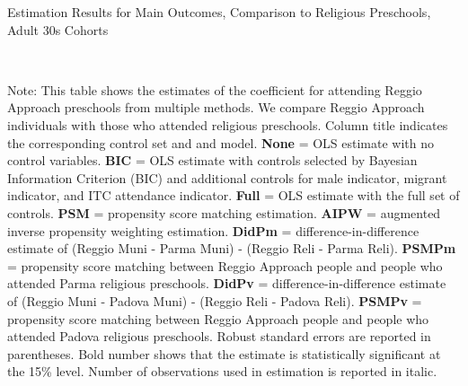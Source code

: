 \begin{table}[H] \caption{Estimation Results for Main Outcomes, Comparison to Religious Preschools, Adult 30s Cohorts} \label{ols-M-adult30-reg-reli}
\scalebox{0.75}{}
\vspace{1ex} \\
\footnotesize\raggedright{Note: This table shows the estimates of the coefficient for attending Reggio Approach preschools from multiple methods. We compare Reggio Approach individuals with those who attended religious preschools. Column title indicates the corresponding control set and and model. \textbf{None} = OLS estimate with no control variables. \textbf{BIC} = OLS estimate with controls selected by Bayesian Information Criterion (BIC) and additional controls for male indicator, migrant indicator, and ITC attendance indicator. \textbf{Full} = OLS estimate with the full set of controls. \textbf{PSM} =  propensity score matching estimation. \textbf{AIPW} = augmented inverse propensity weighting estimation. \textbf{DidPm} = difference-in-difference estimate of (Reggio Muni - Parma Muni) - (Reggio Reli - Parma Reli). \textbf{PSMPm} = propensity score matching between Reggio Approach people and people who attended Parma religious preschools. \textbf{DidPv} = difference-in-difference estimate of (Reggio Muni - Padova Muni) - (Reggio Reli - Padova Reli). \textbf{PSMPv} = propensity score matching between Reggio Approach people and people who attended Padova religious preschools. Robust standard errors are reported in parentheses. Bold number shows that the estimate is statistically significant at the 15\% level. Number of observations used in estimation is reported in italic.}
\end{table}

